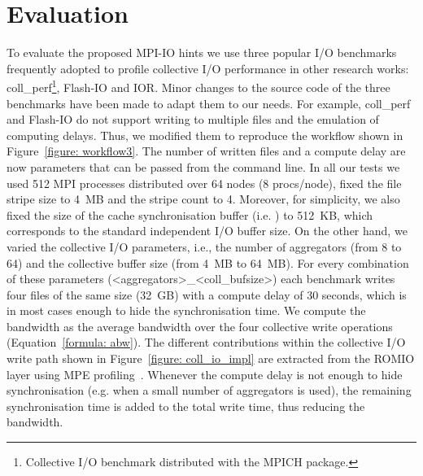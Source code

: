 \section{Evaluation}
\label{sec: evaluation}
To evaluate the proposed MPI-IO hints we use three popular I/O benchmarks frequently adopted to profile collective I/O performance in other research works: coll\_perf\footnote{Collective I/O benchmark distributed with the MPICH package.}, Flash-IO and IOR.
Minor changes to the source code of the three benchmarks have been made to adapt them to our needs. For example, coll\_perf and Flash-IO do not support writing to multiple files and the emulation of computing delays. Thus, we modified them to reproduce the workflow shown in Figure~\ref{figure: workflow3}. The number of written files and a compute delay are now parameters that can be passed from the command line. In all our tests we used 512 MPI processes distributed over 64 nodes (8 procs/node), fixed the file stripe size to 4~MB and the stripe count to 4. Moreover, for simplicity, we also fixed the size of the cache synchronisation buffer (i.e. ) to 512~KB, which corresponds to the standard independent I/O buffer size. On the other hand, we varied the collective I/O parameters, i.e., the number of aggregators (from 8 to 64) and the collective buffer size (from 4~MB to 64~MB). For every combination of these parameters (<aggregators>\_<coll\_bufsize>) each benchmark writes four files of the same size (32~GB) with a compute delay of 30 seconds, which is in most cases enough to hide the synchronisation time. We compute the bandwidth as the average bandwidth over the four collective write operations (Equation~\ref{formula: abw}). The different  contributions within the collective I/O write path shown in Figure~\ref{figure: coll_io_impl} are extracted from the ROMIO layer using MPE profiling~\cite{mpe}.
Whenever the compute delay is not enough to hide synchronisation (e.g. when a small number of aggregators is used), the remaining synchronisation time is added to the total write time, thus reducing the bandwidth.

